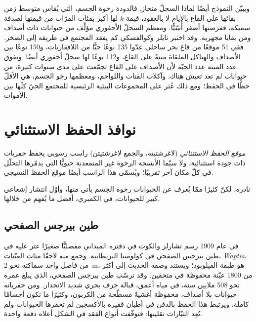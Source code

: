 ويبيّن النموذج أيضًا لماذا السجلّ منحاز. فالدودة رخوة الجسم، التي يُقاس متوسط زمن بقائها على
القاع بالأيام لا بالعقود، قيمة $k$ لها أكبر بمئات المرّات من قيمتها لصدفة
سميكة، ففرصتها أصغر أُسّيًّا. ومعظم السجلّ الأحفوري مؤلَّف من حيوانات
ذات أصداف ومن بقايا مجهرية. وقد اختبر تايلر وكوالفسكي كم يفقد المجتمع في
طريقه إلى الصخر. ففي 51 موقعًا من قاع بحر ساحلي عدّوا 135 نوعًا حيًّا من
اللافقاريات، و150 نوعًا بين الأصداف والهياكل الملقاة ميتةً على القاع، و112 نوعًا
لها سجلّ أحفوري أيضًا. ويفوق عدد الميتة عدد الحيّة لأن الأصداف على القاع تجمّعت
على مدى سنوات كثيرة، من حيوانات لم تعد تعيش هناك. وآكلات الفتات واللواحم، ومعظمها
رخو الجسم، هي الأقلّ حظًّا في الحفظ؛ ومع ذلك عُثر على المجموعات البيئية الرئيسية
للمجتمع الحيّ كلّها بين الأموات.

\section{نوافذ الحفظ الاستثنائي}\label{sec:b2:palaeoenvironments:lagerstatten}

\begin{definition}\label{def:b2:palaeoenvironments:lagerstatte}
\emph{موقع الحفظ الاستثنائي} (لاغرشتيته، والجمع لاغرشتيتن) راسب رسوبي
يحفظ حفريات ذات جودة استثنائية، ولا سيّما الأنسجة الرخوة غير المتمعدنة حيويًّا التي
يدمّرها التحلّل في كلّ مكان آخر تقريبًا؛ ويُسمّى هذا الراسب أيضًا موقع الحفظ النسيجي.
\end{definition}

 نادرة، لكنّ كثيرًا ممّا يُعرف عن الحيوانات رخوة الجسم يأتي منها،
وأوّل انتشار إشعاعي كبير للحيوانات، في الكمبري، أفضل ما يُفهم من خلالها.

\subsection*{طين بيرجس الصفحي}

في عام 1909 رسم تشارلز والكوت في دفتره الميداني مفصليًّا صغيرًا عثر عليه في طين بيرجس
الصفحي في كولومبيا البريطانية. وجمع منه لاحقًا مئات
العيّنات، \emph{Waptia}، من فاصل واحد سماكته نحو \qty{2}{m}، هو طبقة
الفيلوبود؛ ويستند وصفه الحديث إلى أكثر من 1800 عيّنة محفوظة في متحفين. وقد ترسّب طين
بيرجس الصفحي، الذي يبلغ عمره نحو 508 ملايين سنة، في مياه أعمق، قبالة جرف
بحري شديد الانحدار. ومن حفرياته حيوانات بلا أصداف، محفوظة أغشيةً مسطّحة من الكربون،
وكثيرًا ما تكون أجسامًا كاملة. ويرتبط هذا الحفظ بالدفن في أطيان فقيرة بالأكسجين لم تحفرها
الحيوانات ولم تُعِد التيّارات تقليبها: فتوقّفت أنواع الفقد في الشكل أعلاه دفعة واحدة.

